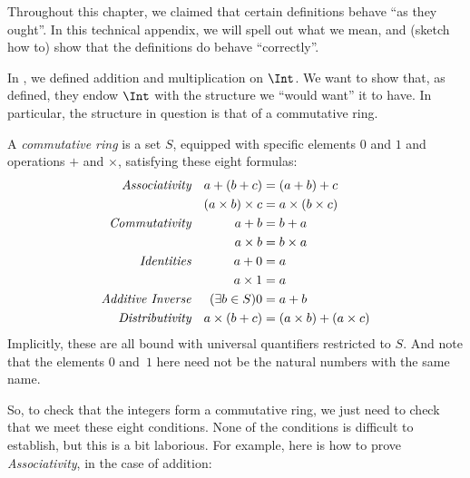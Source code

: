 \documentclass[../../../include/open-logic-section]{subfiles}
\begin{document}
	

Throughout this chapter, we claimed that certain definitions behave
``as they ought''. In this technical appendix, we will spell out what
we mean, and (sketch how to) show that the definitions do behave
``correctly''. 

In , we defined addition and multiplication on $\Int$.
We want to show that, as defined, they endow $\Int$ with the structure
we ``would want'' it to have. In particular, the structure in question
is that of a commutative ring.

\begin{defn}
	A \emph{commutative ring} is a set $S$, equipped with specific elements $0$ and $1$ and operations $+$ and $\times$, satisfying these eight formulas:
	\begin{align*}
		\emph{Associativity}&&a + (b+ c) & = (a + b) + c \\
		&& (a \times b) \times c & = a \times (b\times c)\\
		\emph{Commutativity}&&a + b &= b+ a  \\
		&&  a \times b&= b\times a\\ 
		\emph{Identities}&&a + 0 &= a \\
		&& a \times 1 &= a\\
		\emph{Additive Inverse}&&(\exists b\in S)0&=a + b\\
		\emph{Distributivity}&&a \times (b+ c ) &= (a \times b) + (a \times c)
	\end{align*}
	Implicitly, these are all bound with universal quantifiers restricted to $S$. And note that the elements $0$ and~$1$ here need not be the natural numbers with the same name.
\end{defn}

So, to check that the integers form a commutative ring, we just need
to check that we meet these eight conditions. None of the conditions
is {difficult} to establish, but this is a bit laborious. For example,
here is how to prove \emph{Associativity}, in the case of addition:
\end{document}
